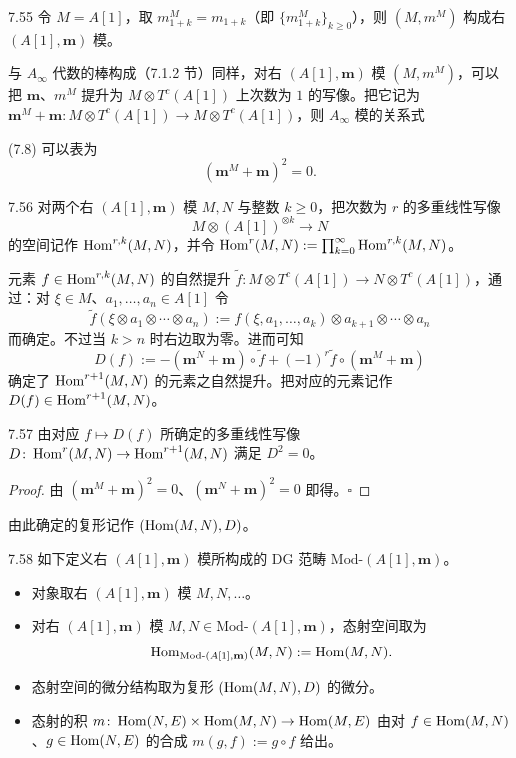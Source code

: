 \begin{proposition}{7.55}
令 $M=A[1]$，取 $m_{1+k}^{M}=m_{1+k}$（即 $\{m_{1+k}^{M}\}_{k\ge 0}$），则 $(M,m^{M})$ 构成右 $(A[1],\mathbf m)$ 模。
\end{proposition}

与 $A_\infty$ 代数的棒构成（7.1.2 节）同样，对右 $(A[1],\mathbf m)$ 模 $(M,m^{M})$，可以把 $\mathbf m$、$m^{M}$ 提升为 $M\otimes T^{c}(A[1])$ 上次数为 $1$ 的写像。把它记为 $\mathbf m^{M}+\mathbf m\colon M\otimes T^{c}(A[1])\to M\otimes T^{c}(A[1])$，则 $A_\infty$ 模的关系式

(7.8) 可以表为
\[
  (\mathbf m^{M}+\mathbf m)^{2}=0.
\]

\begin{definition}{7.56}
对两个右 $(A[1],\mathbf m)$ 模 $M,N$ 与整数 $k\ge 0$，把次数为 $r$ 的多重线性写像
\[
  M\otimes(A[1])^{\otimes k}\longrightarrow N
\]
的空间记作 $\operatorname{Hom}^{r,k}(M,N)$，并令 $\operatorname{Hom}^{r}(M,N):=\prod_{k=0}^{\infty}\operatorname{Hom}^{r,k}(M,N)$。
\end{definition}

元素 $f\in\operatorname{Hom}^{r,k}(M,N)$ 的自然提升 $\tilde f\colon M\otimes T^{c}(A[1])\to N\otimes T^{c}(A[1])$，通过：对 $\xi\in M$、$a_{1},\dots,a_{n}\in A[1]$ 令
\[
  \tilde f(\xi\otimes a_{1}\otimes\cdots\otimes a_{n}):=f(\xi,a_{1},\dots,a_{k})\otimes a_{k+1}\otimes\cdots\otimes a_{n}
\]
而确定。不过当 $k>n$ 时右边取为零。进而可知
\begin{equation}
  D(f):=-(\mathbf m^{N}+\mathbf m)\circ\tilde f+(-1)^{r}\tilde f\circ(\mathbf m^{M}+\mathbf m) \tag{7.9}
\end{equation}
确定了 $\operatorname{Hom}^{r+1}(M,N)$ 的元素之自然提升。把对应的元素记作 $D(f)\in\operatorname{Hom}^{r+1}(M,N)$。

\begin{proposition}{7.57}
由对应 $f\mapsto D(f)$ 所确定的多重线性写像 $D\colon\operatorname{Hom}^{r}(M,N)\to\operatorname{Hom}^{r+1}(M,N)$ 满足 $D^{2}=0$。
\end{proposition}

\begin{proof}
由 $(\mathbf m^{M}+\mathbf m)^{2}=0$、$(\mathbf m^{N}+\mathbf m)^{2}=0$ 即得。\hfill$\square$
\end{proof}

由此确定的复形记作 $(\operatorname{Hom}(M,N),D)$。

\begin{definition}{7.58}
如下定义右 $(A[1],\mathbf m)$ 模所构成的 DG 范畴 $\mathrm{Mod}\text{-}(A[1],\mathbf m)$。
\begin{itemize}[leftmargin=1.6em,itemsep=2pt,topsep=2pt]
  \item 对象取右 $(A[1],\mathbf m)$ 模 $M,N,\dots$。
  \item 对右 $(A[1],\mathbf m)$ 模 $M,N\in\mathrm{Mod}\text{-}(A[1],\mathbf m)$，态射空间取为
  \[
    \operatorname{Hom}_{\mathrm{Mod}\text{-}(A[1],\mathbf m)}(M,N):=\operatorname{Hom}(M,N).
  \]
  \item 态射空间的微分结构取为复形 $(\operatorname{Hom}(M,N),D)$ 的微分。
  \item 态射的积 $m\colon\operatorname{Hom}(N,E)\times\operatorname{Hom}(M,N)\to\operatorname{Hom}(M,E)$ 由对 $f\in\operatorname{Hom}(M,N)$、$g\in\operatorname{Hom}(N,E)$ 的合成 $m(g,f):=g\circ f$ 给出。
\end{itemize}
\end{definition}

